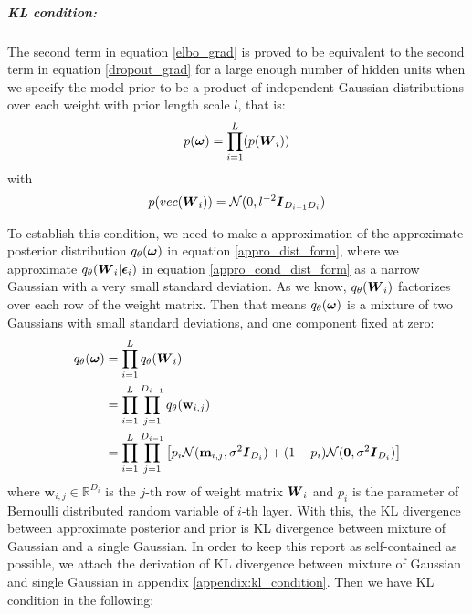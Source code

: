 \subparagraph{KL condition:} The second term in equation \ref{elbo_grad} is proved to be equivalent to the second term in equation \ref{dropout_grad}
for a large enough number of hidden units when we specify the model prior to be a product of independent Gaussian distributions over each weight with prior length scale $l$, that is:
\[p(\boldsymbol \omega) = \prod_{i=1}^{L}(p(\boldsymbol W_{i})) \]
with
\[
p(vec(\boldsymbol W_{i})) = \mathcal N(0, l^{-2}\boldsymbol I_{D_{i-1} D_{i}})
\]

To establish this condition, we need to make a approximation of the approximate posterior distribution $q_{\theta}(\boldsymbol \omega)$ in equation \ref{appro_dist_form}, where we approximate $q_{\theta}(\boldsymbol W_{i}|\boldsymbol \epsilon_{i})$ in equation \ref{appro_cond_dist_form} as a narrow Gaussian with a very small standard deviation. As we know, $q_{\theta}(\boldsymbol W_{i})$ factorizes over each row of the weight matrix. Then that means $q_{\theta}(\boldsymbol \omega)$ is a mixture of two Gaussians with small standard deviations, and one component fixed at zero:
\begin{equation}\label{appro_dist_guassian}
\begin{aligned}
	q_{\theta}(\boldsymbol \omega) &= \prod_{i=1}^{L}q_{\theta}(\boldsymbol W_{i}) \\
	&=\prod_{i=1}^{L}\prod_{j=1}^{D_{i-1}}q_{\theta}(\textbf{w}_{i,j}) \\
	&= \prod_{i=1}^{L}\prod_{j=1}^{D_{i-1}} \big[ p_{i} \mathcal N(\textbf{m}_{i,j},\sigma^{2} \boldsymbol I_{D_{i}}) + (1-p_{i})\mathcal N(\boldsymbol 0, \sigma^{2} \boldsymbol I_{D_{i}})\big]
\end{aligned}
\end{equation}
where $\textbf{w}_{i,j} \in \mathbb R^{D_{i}}$ is the $j$-th row of weight matrix $\boldsymbol W_{i}$ and $p_{i}$ is the parameter of Bernoulli distributed random variable of $i$-th layer. With this, the KL divergence between approximate posterior and prior is KL divergence between mixture of Gaussian and a single Gaussian. In order to keep this report as self-contained as possible, we attach the derivation of KL divergence between mixture of Gaussian and single Gaussian in appendix \ref{appendix:kl_condition}. Then we have KL condition in the following:

